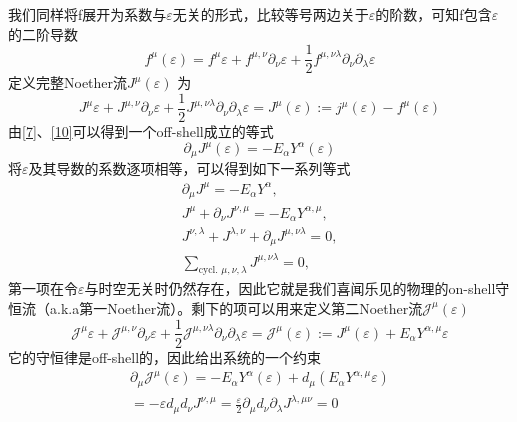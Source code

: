 \documentclass[10pt,openany]{book}
\theoremstyle{thmstyle} %
\theoremstyle{defstyle} %
\theoremstyle{prostyle} %
\begin{document}
我们同样将f展开为系数与$ \varepsilon $无关的形式，比较等号两边关于$ \varepsilon $的阶数，可知f包含$ \varepsilon $的二阶导数
\begin{equation}
  f^\mu(\varepsilon)=f^\mu \varepsilon+f^{\mu, \nu} \partial_\nu \varepsilon+\frac{1}{2} f^{\mu, \nu \lambda} \partial_\nu \partial_\lambda \varepsilon
\end{equation}   
定义完整Noether流$ J^\mu(\varepsilon) $ 为
\begin{equation}
  J^\mu \varepsilon+J^{\mu, \nu} \partial_\nu \varepsilon+\frac{1}{2} J^{\mu, \nu \lambda} \partial_\nu \partial_\lambda \varepsilon=J^\mu(\varepsilon):=j^\mu(\varepsilon)-f^\mu(\varepsilon)
  \label{10}
\end{equation}
由\eqref{7}、\eqref{10}可以得到一个off-shell成立的等式
\begin{equation}
  \partial_\mu J^\mu(\varepsilon)=-E_\alpha Y^\alpha(\varepsilon)  
\end{equation}
将$ \varepsilon $及其导数的系数逐项相等，可以得到如下一系列等式
\begin{equation}
  \begin{gathered}
    \partial_\mu J^\mu=-E_\alpha Y^\alpha, \\
    J^\mu+\partial_\nu J^{\nu, \mu}=-E_\alpha Y^{\alpha, \mu}, \\
    J^{\nu, \lambda}+J^{\lambda, \nu}+\partial_\mu J^{\mu, \nu \lambda}=0, \\
    \sum_{\text {cycl. } \mu, \nu, \lambda} J^{\mu, \nu \lambda}=0,
    \end{gathered}
\end{equation} 
第一项在令$ \varepsilon $与时空无关时仍然存在，因此它就是我们喜闻乐见的物理的on-shell守恒流（a.k.a第一Noether流）。剩下的项可以用来定义第二Noether流$ \mathcal{J}^\mu(\varepsilon) $ 
\begin{equation}
  \mathcal{J}^\mu \varepsilon+\mathcal{J}^{\mu, \nu} \partial_\nu \varepsilon+\frac{1}{2} \mathcal{J}^{\mu, \nu \lambda} \partial_\nu \partial_\lambda \varepsilon=\mathcal{J}^\mu(\varepsilon):=J^\mu(\varepsilon)+E_\alpha Y^{\alpha, \mu} \varepsilon
\end{equation}
它的守恒律是off-shell的，因此给出系统的一个约束
\begin{equation}
  \begin{gathered}
    \partial_\mu \mathcal{J}^\mu(\varepsilon) =-E_\alpha Y^\alpha(\varepsilon)+d_\mu\left(E_\alpha Y^{\alpha, \mu} \varepsilon\right) \\
    =-\varepsilon d_\mu d_\nu J^{\nu, \mu} = \frac{\varepsilon}{2} \partial_\mu d_\nu \partial_\lambda J^{\lambda, \mu \nu} = 0
    \end{gathered}
\end{equation}
\end{document}
